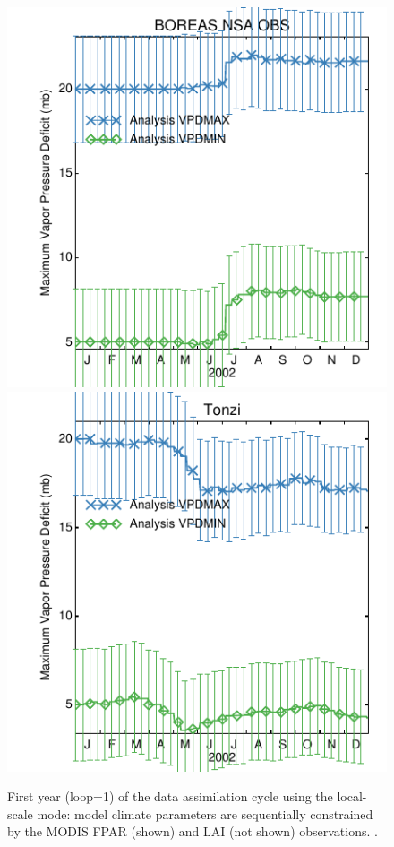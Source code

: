 \documentclass[a4paper,12pt]{article}
\begin{document}
\begin{figure}[hp]
\begin{center}
\includegraphics[scale=0.5]{BOREAS_NSA_OBS.dayplot.2002.VPDMAX.MODIS.pdf}
\includegraphics[scale=0.5]{Tonzi.dayplot.2002.VPDMAX.MODIS.pdf}
\caption{First year (loop=1) of the data assimilation cycle using the local-scale mode: model climate parameters are sequentially constrained by the MODIS FPAR (shown) and LAI (not shown) observations. .}
\label{figure: local 2}
\end{center}
\end{figure}
\end{document}
